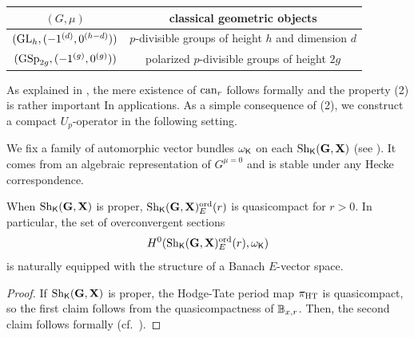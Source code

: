 \documentclass[12pt,reqno]{amsart}
\begin{document}
\vspace{5pt}
\begin{center}
    \begin{tabular}{c|c} 
        $(G, \mu)$ & classical geometric objects \\ \hline
        $({\operatorname{GL}}_h, (- 1^{(d)}, 0^{(h-d)}))$  & $p$-divisible groups of height $h$ and dimension $d$ \\ \hline
        $({\operatorname{GSp}}_{2g}, (- 1^{(g)}, 0^{(g)}))$ & polarized $p$-divisible groups of height $2g$ 
    \end{tabular}
\end{center}
\vspace{5pt}

As explained in , the mere existence of ${\operatorname{can}}_r$ follows formally and the property (2) is rather important In applications. As a simple consequence of (2), we construct a compact $U_p$-operator in the following setting. 

We fix a family of automorphic vector bundles $\omega_{{\mathsf{K}}}$ on each ${\operatorname{Sh}}_{{\mathsf{K}}}(\mathbf{G}, \mathbf{X})$ (see \cite[Section 4.1.1]{BP21}). It comes from an algebraic representation of $G^{\mu = 0}$ and is stable under any Hecke correspondence. 

\begin{lem}
    When ${\operatorname{Sh}}_{{\mathsf{K}}}(\mathbf{G}, \mathbf{X})$ is proper, ${\operatorname{Sh}}_{{\mathsf{K}}}(\mathbf{G}, \mathbf{X})_E^{{\operatorname{ord}}}(r)$ is quasicompact for $r > 0$. In particular, the set of overconvergent sections 
    \[
        H^0({\operatorname{Sh}}_{{\mathsf{K}}}(\mathbf{G}, \mathbf{X})_E^{{\operatorname{ord}}}(r), \omega_{{\mathsf{K}}})
    \] 
    is naturally equipped with the structure of a Banach $E$-vector space. 
\end{lem}
\begin{proof}
    If ${\operatorname{Sh}}_{{\mathsf{K}}}(\mathbf{G}, \mathbf{X})$ is proper, the Hodge-Tate period map $\pi_{\operatorname{HT}}$ is quasicompact, so the first claim follows from the quasicompactness of $\mathbb{B}_{x, r}$. Then, the second claim follows formally (cf.\ \cite[Lemma 2.5.20]{BP21}). 
\end{proof}
\end{document}

